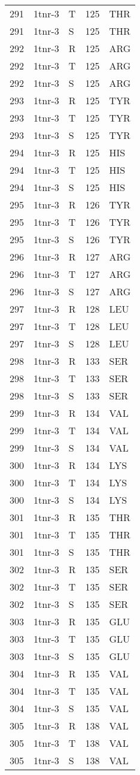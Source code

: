 \begin{longtable}[l]{l|l|l|l|l}
	291 & 1tnr-3 & T & 125 & THR \\
	291 & 1tnr-3 & S & 125 & THR \\
	292 & 1tnr-3 & R & 125 & ARG \\
	292 & 1tnr-3 & T & 125 & ARG \\
	292 & 1tnr-3 & S & 125 & ARG \\
	293 & 1tnr-3 & R & 125 & TYR \\
	293 & 1tnr-3 & T & 125 & TYR \\
	293 & 1tnr-3 & S & 125 & TYR \\
	294 & 1tnr-3 & R & 125 & HIS \\
	294 & 1tnr-3 & T & 125 & HIS \\
	294 & 1tnr-3 & S & 125 & HIS \\
	295 & 1tnr-3 & R & 126 & TYR \\
	295 & 1tnr-3 & T & 126 & TYR \\
	295 & 1tnr-3 & S & 126 & TYR \\
	296 & 1tnr-3 & R & 127 & ARG \\
	296 & 1tnr-3 & T & 127 & ARG \\
	296 & 1tnr-3 & S & 127 & ARG \\
	297 & 1tnr-3 & R & 128 & LEU \\
	297 & 1tnr-3 & T & 128 & LEU \\
	297 & 1tnr-3 & S & 128 & LEU \\
	298 & 1tnr-3 & R & 133 & SER \\
	298 & 1tnr-3 & T & 133 & SER \\
	298 & 1tnr-3 & S & 133 & SER \\
	299 & 1tnr-3 & R & 134 & VAL \\
	299 & 1tnr-3 & T & 134 & VAL \\
	299 & 1tnr-3 & S & 134 & VAL \\
	300 & 1tnr-3 & R & 134 & LYS \\
	300 & 1tnr-3 & T & 134 & LYS \\
	300 & 1tnr-3 & S & 134 & LYS \\
	301 & 1tnr-3 & R & 135 & THR \\
	301 & 1tnr-3 & T & 135 & THR \\
	301 & 1tnr-3 & S & 135 & THR \\
	302 & 1tnr-3 & R & 135 & SER \\
	302 & 1tnr-3 & T & 135 & SER \\
	302 & 1tnr-3 & S & 135 & SER \\
	303 & 1tnr-3 & R & 135 & GLU \\
	303 & 1tnr-3 & T & 135 & GLU \\
	303 & 1tnr-3 & S & 135 & GLU \\
	304 & 1tnr-3 & R & 135 & VAL \\
	304 & 1tnr-3 & T & 135 & VAL \\
	304 & 1tnr-3 & S & 135 & VAL \\
	305 & 1tnr-3 & R & 138 & VAL \\
	305 & 1tnr-3 & T & 138 & VAL \\
	305 & 1tnr-3 & S & 138 & VAL \\
\end{longtable}